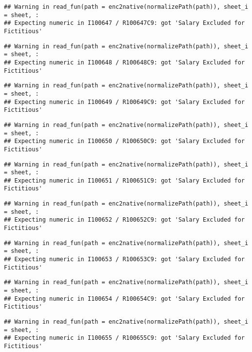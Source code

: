 \documentclass[
]{article}
\begin{document}
\begin{verbatim}
## Warning in read_fun(path = enc2native(normalizePath(path)), sheet_i = sheet, :
## Expecting numeric in I100647 / R100647C9: got 'Salary Excluded for Fictitious'
\end{verbatim}

\begin{verbatim}
## Warning in read_fun(path = enc2native(normalizePath(path)), sheet_i = sheet, :
## Expecting numeric in I100648 / R100648C9: got 'Salary Excluded for Fictitious'
\end{verbatim}

\begin{verbatim}
## Warning in read_fun(path = enc2native(normalizePath(path)), sheet_i = sheet, :
## Expecting numeric in I100649 / R100649C9: got 'Salary Excluded for Fictitious'
\end{verbatim}

\begin{verbatim}
## Warning in read_fun(path = enc2native(normalizePath(path)), sheet_i = sheet, :
## Expecting numeric in I100650 / R100650C9: got 'Salary Excluded for Fictitious'
\end{verbatim}

\begin{verbatim}
## Warning in read_fun(path = enc2native(normalizePath(path)), sheet_i = sheet, :
## Expecting numeric in I100651 / R100651C9: got 'Salary Excluded for Fictitious'
\end{verbatim}

\begin{verbatim}
## Warning in read_fun(path = enc2native(normalizePath(path)), sheet_i = sheet, :
## Expecting numeric in I100652 / R100652C9: got 'Salary Excluded for Fictitious'
\end{verbatim}

\begin{verbatim}
## Warning in read_fun(path = enc2native(normalizePath(path)), sheet_i = sheet, :
## Expecting numeric in I100653 / R100653C9: got 'Salary Excluded for Fictitious'
\end{verbatim}

\begin{verbatim}
## Warning in read_fun(path = enc2native(normalizePath(path)), sheet_i = sheet, :
## Expecting numeric in I100654 / R100654C9: got 'Salary Excluded for Fictitious'
\end{verbatim}

\begin{verbatim}
## Warning in read_fun(path = enc2native(normalizePath(path)), sheet_i = sheet, :
## Expecting numeric in I100655 / R100655C9: got 'Salary Excluded for Fictitious'
\end{verbatim}
\end{document}
